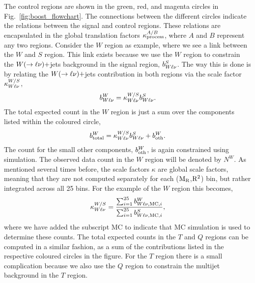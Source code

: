 The control regions are shown in the green, red, and magenta circles in
Fig.~\ref{fig:boost_flowchart}. The connections between the different circles indicate the
relations between the signal and control regions. These relations are encapsulated in the global
translation factors $\kappa^{A/B}_{\rm process}$, where $A$ and $B$ represent any two regions. 
Consider the $W$ region as example, where we see a link between the $W$ and $S$ region. This link
exists because we use the $W$ region to constrain the $W(\rightarrow \ell\nu)+$jets background in
the signal region, $b^S_{W\ell\nu}$. The way this is done is by relating the $W(\rightarrow
\ell\nu)+$jets contribution in both regions via the scale factor $\kappa^{W/S}_{W\ell\nu}$, 
\begin{equation}
  b^W_{W\ell\nu} = \kappa^{W/S}_{W\ell\nu} b^S_{W\ell\nu}  .
\end{equation}
The total expected count in the $W$ region is just a sum over the components listed within the
coloured circle, 
\begin{equation}
  b^W_{\rm total} = \kappa^{W/S}_{W\ell\nu} b^S_{W\ell\nu}  + b_{\rm oth}^W .
\end{equation}
The count for the small other components, $b_{\rm oth}^W$, is again constrained using simulation.
The observed data count in the $W$ region will be denoted by $N^W$. 
As mentioned several times before, the scale factors $\kappa$ are global scale factors, meaning that
they are not computed separately for each ($\mathrm{M_R}$,$\mathrm{R^2}$) bin, but rather integrated across all 25
bins. For the example of the $W$ region this becomes,
\begin{equation}
  \kappa^{W/S}_{W\ell\nu} = \frac{ \sum_{i=1}^{25} b^W_{W\ell\nu, {\rm MC}, i}} {
\sum_{i=1}^{25} b^S_{W\ell\nu, {\rm MC}, i}} ,
\label{eq:kappa_example}
\end{equation}
where we have added the subscript MC to indicate that MC simulation is used to determine these
counts. 
The total expected counts in the $T$ and $Q$ regions can be computed in a similar fashion, as a sum
of the contributions listed in the respective coloured circles in the figure. For the $T$ region
there is a small complication because we also use the $Q$ region to constrain the multijet
background in the $T$ region. 

